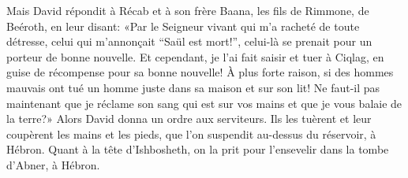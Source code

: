 Mais David répondit à Récab et à son frère Baana,
		les fils de Rimmone, de Beéroth, en leur disant:
	«Par le Seigneur vivant qui m’a racheté de toute détresse,
	celui qui m’annonçait “Saül est mort!”,
	celui-là se prenait pour un porteur de bonne nouvelle.
Et cependant, je l’ai fait saisir et tuer à Ciqlag,
	en guise de récompense pour sa bonne nouvelle!
À plus forte raison, si des hommes mauvais ont tué un homme juste
		dans sa maison et sur son lit!
	Ne faut-il pas maintenant que je réclame son sang qui est sur vos mains
	et que je vous balaie de la terre?»
Alors David donna un ordre aux serviteurs.
Ils les tuèrent et leur coupèrent les mains et les pieds,
	que l’on suspendit au-dessus du réservoir, à Hébron.
Quant à la tête d’Ishbosheth, on la prit pour l’ensevelir dans la tombe d’Abner, à Hébron.
